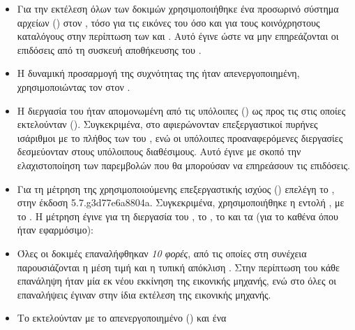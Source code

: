 \begin{itemize}
    \item Για την εκτέλεση όλων των δοκιμών χρησιμοποιήθηκε ένα προσωρινό
          σύστημα αρχείων (\emph{}) %
          στον \host{}, τόσο για τις εικόνες του \osv{} όσο και για τους
          κοινόχρηστους καταλόγους στην περίπτωση των \viofs{} και .
          Αυτό έγινε ώστε να μην επηρεάζονται οι επιδόσεις από τη συσκευή
          αποθήκευσης του \host{}.
    \item Η δυναμική προσαρμογή της συχνότητας της  ήταν
          απενεργοποιημένη, χρησιμοποιώντας τον \emph{} %
          στον \host{}.
    \item Η διεργασία του \qemu{} ήταν απομονωμένη από τις υπόλοιπες
          () ως προς τις  στις οποίες
          εκτελούνταν (\emph{}). %
          Συγκεκριμένα, στο \qemu{} αφιερώνονταν επεξεργαστικοί πυρήνες
          ισάριθμοι με το πλήθος των  του \guest{}, ενώ οι υπόλοιπες
          προαναφερόμενες διεργασίες δεσμεύονταν στους υπόλοιπους διαθέσιμους.
          Αυτό έγινε με σκοπό την ελαχιστοποίηση των παρεμβολών που θα μπορούσαν
          να επηρεάσουν τις επιδόσεις.
    \item Για τη μέτρηση της χρησιμοποιούμενης επεξεργαστικής ισχύος () επελέγη το \emph{} \cite{perf}, στην έκδοση
          5.7.g3d77e6a8804a. Συγκεκριμένα, χρησιμοποιήθηκε η εντολή
          \texttt{}, με το . Η
          μέτρηση έγινε για τη διεργασία του \qemu{}, το , το
           και τα  (για το καθένα
          όπου ήταν εφαρμόσιμο):
    \item Όλες οι δοκιμές επαναλήφθηκαν \emph{10 φορές}, από τις οποίες στη
          συνέχεια παρουσιάζονται η μέση τιμή  και η τυπική απόκλιση
          . Στην περίπτωση του \osv{} κάθε επανάληψη ήταν
          μία εκ νέου εκκίνηση της εικονικής μηχανής, ενώ στο \linux{} όλες οι
          επαναλήψεις έγιναν στην ίδια εκτέλεση της εικονικής μηχανής.
    \item Το  εκτελούνταν με το  απενεργοποιημένο
          (\texttt{}) και ένα 

\end{itemize}
